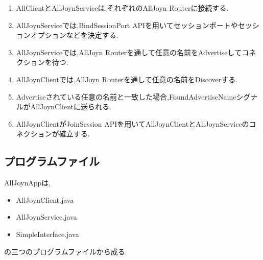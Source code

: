 \begin{enumerate}
\item AllClientとAllJoynServiceは,それぞれのAllJoyn Routerに接続する.
\item AllJoynServiceでは,BindSessionPort APIを用いてセッションポートやセッションオプションなどを決定する.
\item AllJoynServiceでは,AllJoyn Routerを通して任意の名前をAdvertiseしてコネクションを待つ.
\item AllJoynClientでは,AllJoyn Routerを通して任意の名前をDiscoverする.
\item Advertiseされている任意の名前と一致した場合,FoundAdvertiseNameシグナルがAllJoynClientに送られる.
\item AllJoynClientがJoinSession APIを用いてAllJoynClientとAllJoynServiceのコネクションが確立する.
\end{enumerate}


\subsection{プログラムファイル}
AllJoynAppは,
\begin{itemize}
\item AllJoynClient.java
\item AllJoynService.java
\item SimpleInterface.java
\end{itemize}
の三つのプログラムファイルから成る.


